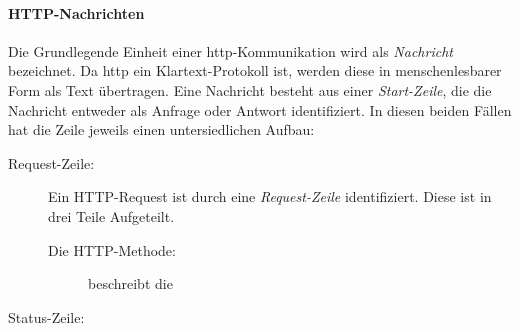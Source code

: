 \paragraph{HTTP-Nachrichten}
Die Grundlegende Einheit einer \ac{http}-Kommunikation wird als \textit{Nachricht} bezeichnet.
Da \ac{http} ein Klartext-Protokoll ist, werden diese in menschenlesbarer Form als Text übertragen.
Eine Nachricht besteht aus einer \textit{Start-Zeile}, die die Nachricht entweder als Anfrage oder Antwort identifiziert. In diesen beiden Fällen hat die Zeile jeweils einen untersiedlichen Aufbau:

\begin{description}
     \item[Request-Zeile:] Ein HTTP-Request ist durch eine \textit{Request-Zeile} identifiziert. Diese ist in drei Teile Aufgeteilt.
     \begin{description}
          \item[Die HTTP-Methode:] beschreibt die   
     \end{description}
     \item[Status-Zeile:] 
\end{description}


\pagebreak    